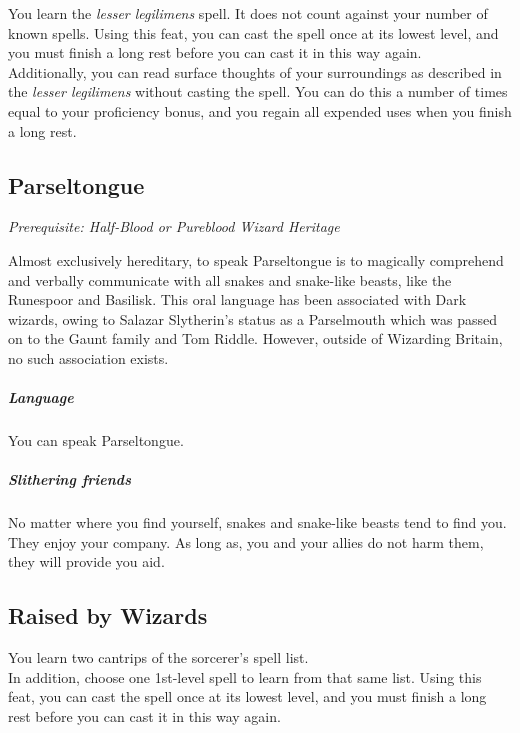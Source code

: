 \documentclass[a4paper,twocolumn,openany,nodeprecatedcode]{dndbook}
\begin{document}
        You learn the \textit{lesser legilimens} spell.
        It does not count against your number of known spells.
        Using this feat, you can cast the spell once at its lowest level, and you must finish a long rest before you can cast it in this way again.\\

        Additionally, you can read surface thoughts of your surroundings as described in the \textit{lesser legilimens} without casting the spell.
        You can do this a number of times equal to your proficiency bonus, and you regain all expended uses when you finish a long rest.


    \subsection{Parseltongue}

        \textit{Prerequisite: Half-Blood or Pureblood Wizard Heritage}

        Almost exclusively hereditary, to speak Parseltongue is to magically comprehend and verbally communicate with all snakes and snake-like beasts, like the Runespoor and Basilisk. This oral language has been associated with Dark wizards, owing to Salazar Slytherin's status as a Parselmouth which was passed on to the Gaunt family and Tom Riddle. However, outside of Wizarding Britain, no such association exists.

        \subparagraph{Language} You can speak Parseltongue.

        \subparagraph{Slithering friends}
        No matter where you find yourself,
        snakes and snake-like beasts tend to find you.
        They enjoy your company.
        As long as, you and your allies do not harm them, they will provide you aid.


    \subsection{Raised by Wizards}

        You learn two cantrips of the sorcerer's spell list.\\
        In addition, choose one 1st-level spell to learn from that same list.
        Using this feat, you can cast the spell once at its lowest level, and you must finish a long rest before you can cast it in this way again.\\
\end{document}
